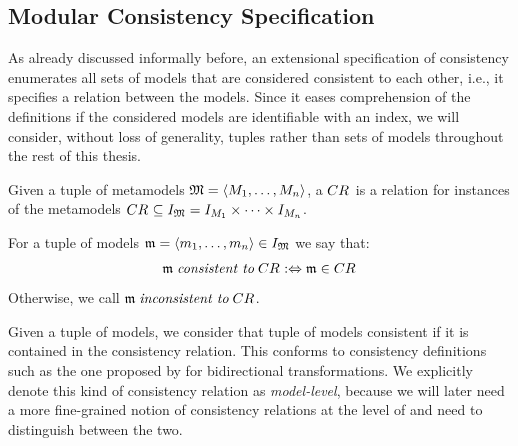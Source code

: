 \subsection{Modular Consistency Specification}

As already discussed informally before, an extensional specification of consistency enumerates all sets of models that are considered consistent to each other, i.e., it specifies a relation between the models.
Since it eases comprehension of the definitions if the considered models are identifiable with an index, we will consider, without loss of generality, tuples rather than sets of models throughout the rest of this thesis.

\begin{definition}[\ModelLevelConsistencyRelation]
    Given a tuple of metamodels $\mathfrak{M} = \langle M_{1}, \dots, M_{n} \rangle$, a \emph{\modellevelconsistencyrelation} $CR_{}$ is a relation for instances of the metamodels $CR_{} \subseteq I_{\mathfrak{M}} = I_{M_{1}} \times \dots \times I_{M_{n}}$.

    For a tuple of models $\mathfrak{m} = \langle m_{1}, \dots, m_{n} \rangle \in I_{\mathfrak{M}}$ we say that:
    \begin{align*}
        \mathfrak{m} \; \textit{consistent to} \; CR_{} :\Leftrightarrow \mathfrak{m} \in CR_{}
    \end{align*}
    Otherwise, we call $\mathfrak{m} \; \textit{inconsistent to} \; CR_{}$.
\end{definition}

Given a tuple of models, we consider that tuple of models consistent if it is contained in the consistency relation.
This conforms to consistency definitions such as the one proposed by \textcite{stevens2010sosym} for bidirectional transformations.
We explicitly denote this kind of consistency relation as \emph{model-level}, because we will later need a more fine-grained notion of consistency relations at the level of \metaclasses and need to distinguish between the two.

